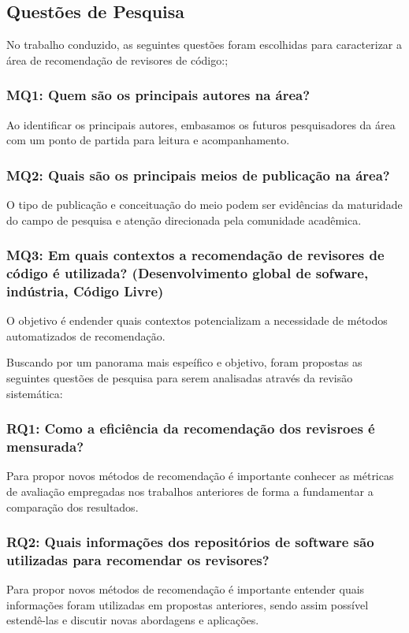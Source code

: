 \documentclass[12pt,openany,oneside,a4paper,english,brazil]{abntbibufjf}
\begin{document}
\subsection{Questões de Pesquisa}

No trabalho conduzido, as seguintes questões foram escolhidas para caracterizar a área de recomendação de revisores de código:;

\subsubsection{\textbf{MQ1: Quem são os principais autores na área?}} Ao identificar os principais autores, embasamos os futuros pesquisadores da área com um ponto de partida para leitura e acompanhamento.

\subsubsection{\textbf{MQ2: Quais são os principais meios de publicação na área?}} O tipo de publicação e conceituação do meio podem ser evidências da maturidade do campo de pesquisa e atenção direcionada pela comunidade acadêmica.

\subsubsection{\textbf{MQ3: Em quais contextos a recomendação de revisores de código é utilizada? (Desenvolvimento global de sofware, indústria, Código Livre)}} O objetivo é endender quais contextos potencializam a necessidade de métodos automatizados de recomendação.

Buscando por um panorama mais espeífico e objetivo, foram propostas as seguintes questões de pesquisa para serem analisadas através da revisão sistemática:

\subsubsection{\textbf{RQ1: Como a eficiência da recomendação dos revisroes é mensurada?}} Para propor novos métodos de recomendação é importante conhecer as métricas de avaliação empregadas nos trabalhos anteriores de forma a fundamentar a comparação dos resultados.

\subsubsection{\textbf{RQ2: Quais informações dos repositórios de software são utilizadas para recomendar os revisores?}} Para propor novos métodos de recomendação é importante entender quais informações foram utilizadas em propostas anteriores, sendo assim possível estendê-las e discutir novas abordagens e aplicações.
\end{document}
